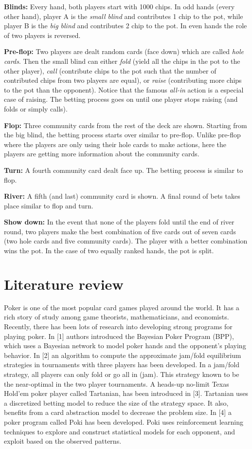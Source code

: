 \BIT
\item \textbf{Blinds:} Every hand, both players start with 1000 chips. In odd hands (every other 
hand), player A is the \emph{small blind} and contributes 1 chip to the pot, while 
player B is the \emph{big blind} and contributes 2 chip to the pot. In even hands the 
role of two players is reversed. 
\item \textbf{Pre-flop:} Two players are dealt random cards (face down) which are called
\emph{hole cards}. Then the small blind can either \emph{fold} (\ie yield all the chips in
the pot to the other player), \emph{call} (contribute chips to the pot such that the number
of contributed chips from two players are equal), or \emph{raise} (contributing more chips
to the pot than the opponent). Notice that the famous \emph{all-in} action is a especial case
of raising. The betting process goes on until one player stops raising (and folds or simply calls).
\item \textbf{Flop:} Three community cards from the rest of the deck are shown. Starting from
the big blind, the betting process starts over similar to pre-flop. Unlike pre-flop where the
players are only using their hole cards to make actions, here the players are getting more
information about the community cards.
\item \textbf{Turn:} A fourth community card dealt face up. The betting process is similar to
flop.
\item \textbf{River:} A fifth (and last) community card is shown. A final round of bets takes place
similar to flop and turn.
\item \textbf{Show down:} In the event that none of the players fold until the end of river round,
two players make the best combination of five cards out of seven cards (two hole cards and 
five community cards). The player with a better combination wins the pot. In the case of
two equally ranked hands, the pot is split.
\EIT

\section{Literature review}
Poker is one of the most popular card games played around the world.
It has a rich story of study among game theorists, mathematicians, 
and economists. Recently, there has been lots  of research into 
developing strong programs for playing poker. In [1] authors introduced
the Bayesian Poker Program (BPP), which uses a Bayesian network to model 
poker hands and the opponent's playing behavior. In [2] an algorithm
to compute the approximate jam/fold equilibrium strategies in tournaments 
with three players has been developed. In a jam/fold strategy, all
players can only fold or go all in (jam). This strategy known to be 
the near-optimal in the two player tournaments. A heads-up no-limit Texas 
Hold'em poker player called Tartanian, has been introduced in [3]. Tartanian
uses a discretized betting model to reduce the size of the strategy space.
It also, benefits from a card abstraction model to decrease the problem size.
In [4] a poker program called Poki has been developed. Poki uses reinforcement 
learning techniques to explore and construct statistical models for each opponent,
 and exploit based on the observed patterns. 
 
